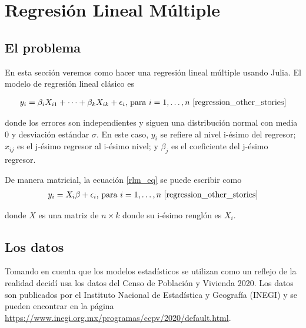 \chapter{Regresión Lineal Múltiple}

\section{El problema}
En esta sección veremos como hacer una regresión lineal múltiple usando Julia. El modelo de regresión lineal clásico es 


\begin{equation} \label{rlm_eq}
    \begin{aligned}
    y_i = \beta_i X_{i1} + \dots + \beta_k X_{ik} + \epsilon_i \text{, para } i = 1, \dots, n \text{ \cite[p.~146]{regression_other_stories}}
    \end{aligned}
\end{equation}

donde los errores son independientes y siguen una distribución normal con media 0 y desviación estándar $\sigma$. En este caso, $y_i$ se refiere al nivel i-ésimo del regresor; $x_{ij}$ es el j-ésimo regresor al i-ésimo nivel; y $\beta_j$ es el coeficiente del j-ésimo regresor. 


De manera matricial, la ecuación \ref{rlm_eq} se puede escribir como \begin{equation*}
    \begin{aligned}
    y_i = X_i \beta + \epsilon_i \text{, para } i = 1, \dots, n
    \text{ \cite[p.~146]{regression_other_stories}}
    \end{aligned}
\end{equation*}

donde $X$ es una matriz de $n \times k$ donde su i-ésimo renglón es $X_i$. 

\section{Los datos}
Tomando en cuenta que los modelos estadísticos se utilizan como un reflejo de la realidad decidí usa los datos del Censo de Población y Vivienda 2020. Los datos son publicados por el Instituto Nacional de Estadística y Geografía (INEGI) y se pueden encontrar en la página \url{https://www.inegi.org.mx/programas/ccpv/2020/default.html}. 


